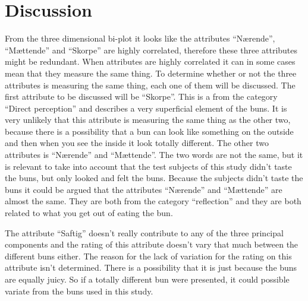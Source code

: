 \section*{Discussion}
\label{discussion}
%
From the three dimensional bi-plot it looks like the attributes “Nærende”, “Mættende” and “Skorpe” are highly correlated, therefore these three attributes might be redundant. 
When attributes are highly correlated it can in some cases mean that they measure the same thing. To determine whether or not the three attributes is measuring the same thing, each one of them will be discussed. \blankline
%
The first attribute to be discussed will be ``Skorpe''. This is a from the category ``Direct perception'' and describes a very superficial element of the buns. It is very unlikely that this attribute is measuring the same thing as the other two, because there is a possibility that a bun can look like something on the outside and then when you see the inside it look totally different. \blankline
%
The other two attributes is “Nærende” and “Mættende”. The two words are not the same, but it is relevant to take into account that the test subjects of this study didn't taste the buns, but only looked and felt the buns. Because the subjects didn't taste the buns it could be argued that the attributes “Nærende” and “Mættende” are almost the same. They are both from the category ``reflection'' and they are both related to what you get out of eating the bun. \blankline

The attribute ``Saftig'' doesn't really contribute to any of the three principal components and the rating of this attribute doesn't vary that much between the different buns either. The reason for the lack of variation for the rating on this attribute isn't determined. There is a possibility that it is just because the buns are equally juicy. So if a totally different bun were presented, it could possible variate from the buns used in this study. 